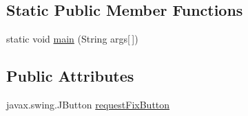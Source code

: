 \subsection*{Static Public Member Functions}
\begin{DoxyCompactItemize}
\item 
static void \hyperlink{classTrainControllerComps_1_1TCFailures_a6c248a0171ceab80ac94ea966e97d5ba}{main} (String args\mbox{[}$\,$\mbox{]})
\end{DoxyCompactItemize}
\subsection*{Public Attributes}
\begin{DoxyCompactItemize}
\item 
javax.\+swing.\+J\+Button \hyperlink{classTrainControllerComps_1_1TCFailures_a0759ba38c88b24a362214722ef0dbfa7}{request\+Fix\+Button}
\end{DoxyCompactItemize}

